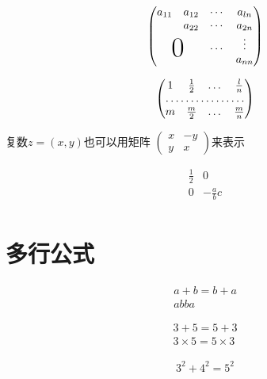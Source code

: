 \documentclass{article} %
\begin{document}
		\[
			\begin{pmatrix}%
				a_{11}&a_{12}&\cdots&a_{ln}\\
				&a_{22}&\cdots&a_{2n}\\
				&		&\dots &\vdots \\
				\multicolumn{2}{c}{\raisebox{1.3ex}[0pt]{\Huge 0}}
				&		&a_{nn}
			\end{pmatrix}
		\]


		\[
			\begin{pmatrix}%
				1&\frac 12 &\dots &\frac ln \\
				\hdotsfor{4}\\
				m&\frac m2& \dots &\frac mn
			\end{pmatrix}
		\]

		复数$z=(x,y)$也可以用矩阵
		\begin{math}
	   		\left(%
   				\begin{smallmatrix}
					x& -y\\y&x
   				\end{smallmatrix}
			\right)%
		\end{math}来表示

		\[
			\begin{array}{r|r}
				\frac 12&0\\
				\hline
				0& -\frac abc\\
			\end{array}
		\]
		
		
		
	
	
	
	
	
	
	\newpage
	\section{多行公式}
	\begin{gather}
		a+b=b+a\\
		ab  ba
	\end{gather}
	
	\begin{gather*}
	3+5=5+3\\
	3 \times 5=5\times 3
	\end{gather*}
	
	\begin{gather}
		3^2+4^2=5^2
	\end{gather}
	
\end{document}
